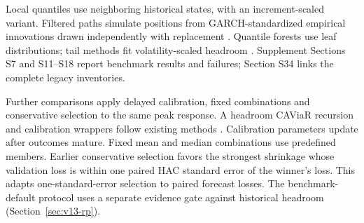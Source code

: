 \documentclass[11pt,a4paper]{article}
\begin{document}
Local quantiles use neighboring historical states, with an increment-scaled variant. Filtered paths simulate positions from GARCH-standardized empirical innovations drawn independently with replacement \citep{hull1998,barone1999}. Quantile forests use leaf distributions; tail methods fit volatility-scaled headroom \citep{meinshausen2006,mcneilfrey2000}. Supplement Sections S7 and S11--S18 report benchmark results and failures; Section S34 links the complete legacy inventories.

Further comparisons apply delayed calibration, fixed combinations and conservative selection to the same peak response. A headroom CAViaR recursion and calibration wrappers follow existing methods \citep{engle2004,gibbs2021}. Calibration parameters update after outcomes mature. Fixed mean and median combinations use predefined members. Earlier conservative selection favors the strongest shrinkage whose validation loss is within one paired HAC standard error of the winner's loss. This adapts one-standard-error selection \citep{hastie2009} to paired forecast losses. The benchmark-default protocol uses a separate evidence gate against historical headroom (Section~\ref{sec:v13-rp}).
\end{document}
